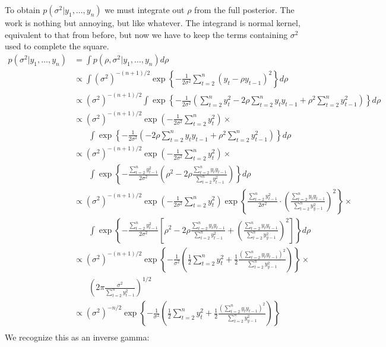 \documentclass[12pt]{article}
\begin{document}
\noindent To obtain $p(\sigma^2|y_1,\ldots,y_n)$ we must integrate out $\rho$ from the full posterior. The work is nothing but annoying, but like whatever. The integrand is normal kernel, equivalent to that from before, but now we have to keep the terms containing $\sigma^2$ used to complete the square.
\begin{align*}
p(\sigma^2|y_1,\ldots,y_n) &= \int p(\rho,\sigma^2|y_1,\ldots,y_n)d\rho \\
&\propto \int (\sigma^2)^{-(n+1)/2} \exp\left\{-\frac{1}{2\sigma^2}\sum_{t=2}^n(y_t-\rho y_{t-1})^2\right\} d\rho \\
&\propto (\sigma^2)^{-(n+1)/2} \int \exp\left\{-\frac{1}{2\sigma^2}\left(\sum_{t=2}^ny_t^2 - 2\rho\sum_{t=2}^ny_t y_{t-1}+\rho^2\sum_{t=2}^ny_{t-1}^2\right)\right\} d\rho \\
&\propto (\sigma^2)^{-(n+1)/2}\exp\left(-\frac{1}{2\sigma^2}\sum_{t=2}^ny_t^2\right) \times \\
& ~~~~ ~~~~ \int \exp\left\{-\frac{1}{2\sigma^2}\left(- 2\rho\sum_{t=2}^ny_t y_{t-1}+\rho^2\sum_{t=2}^ny_{t-1}^2\right)\right\} d\rho \\
&\propto (\sigma^2)^{-(n+1)/2}\exp\left(-\frac{1}{2\sigma^2}\sum_{t=2}^ny_t^2\right) \times \\
& ~~~~ ~~~~ \int \exp\left\{-\frac{\sum_{t=2}^ny_{t-1}^2}{2\sigma^2}\left(\rho^2- 2\rho\frac{\sum_{t=2}^ny_t y_{t-1}}{\sum_{t=2}^ny_{t-1}^2}\right)\right\} d\rho \\
&\propto (\sigma^2)^{-(n+1)/2}\exp\left(-\frac{1}{2\sigma^2}\sum_{t=2}^ny_t^2\right)\exp\left\{\frac{\sum_{t=2}^ny_{t-1}^2}{2\sigma^2}\cdot\left(\frac{\sum_{t=2}^ny_t y_{t-1}}{\sum_{t=2}^ny_{y-1}^2}\right)^2\right\}  \times \\
& ~~~~ ~~~~ \int \exp\left\{-\frac{\sum_{t=2}^ny_{t-1}^2}{2\sigma^2}\left[\rho^2- 2\rho\frac{\sum_{t=2}^ny_t y_{t-1}}{\sum_{t=2}^ny_{t-1}^2}+\left(\frac{\sum_{t=2}^ny_t y_{t-1}}{\sum_{t=2}^ny_{y-1}^2}\right)^2\right]\right\} d\rho \\
&\propto (\sigma^2)^{-(n+1)/2}\exp\left\{-\frac{1}{\sigma^2}\left(\frac{1}{2}\sum_{t=2}^ny_t^2 +\frac{1}{2}\frac{(\sum_{t=2}^ny_t y_{t-1})^2}{\sum_{t=2}^ny_{y-1}^2}\right)\right\}  \times \\
& ~~~~ ~~~~ \left(2\pi\frac{\sigma^2}{\sum_{t=2}^ny_{t-1}^2}\right)^{1/2} \\
&\propto (\sigma^2)^{-n/2}\exp\left\{-\frac{1}{\sigma^2}\left(\frac{1}{2}\sum_{t=2}^ny_t^2 +\frac{1}{2}\frac{(\sum_{t=2}^ny_t y_{t-1})^2}{\sum_{t=2}^ny_{y-1}^2}\right)\right\} \\
\end{align*}
\noindent We recognize this as an inverse gamma:
\end{document}
